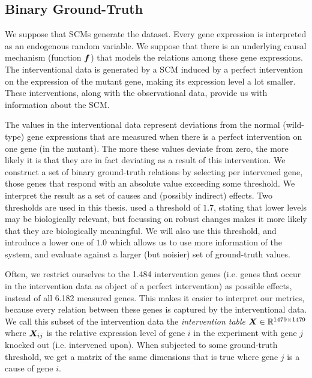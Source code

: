 \subsection{Binary Ground-Truth}
We suppose that SCMs generate the dataset. Every gene expression is interpreted as an endogenous random variable. We suppose that there is an underlying causal mechanism (function $\bm{f}$) that models the relations among these gene expressions. The interventional data is generated by a SCM induced by a perfect intervention on the expression of the mutant gene, making its expression level a lot smaller. These interventions, along with the observational data, provide us with information about the SCM. 

The values in the interventional data represent deviations from the normal (wild-type) gene expressions that are measured when there is a perfect intervention on one gene (in the mutant). The more these values deviate from zero, the more likely it is that they are in fact deviating as a result of this intervention. We construct a set of binary ground-truth relations by selecting per intervened gene, those genes that respond with an absolute value exceeding some threshold. We interpret the result as a set of causes and (possibly indirect) effects. Two thresholds are used in this thesis. \citet{kemmeren2014large} used a threshold of $1.7$, stating that lower levels may be biologically relevant, but focussing on robust changes makes it more likely that they are biologically meaningful. We will also use this threshold, and introduce a lower one of $1.0$ which allows us to use more information of the system, and evaluate against a larger (but noisier) set of ground-truth values. 

Often, we restrict ourselves to the 1.484 intervention genes (i.e. genes that occur in the intervention data as object of a perfect intervention) as possible effects, instead of all 6.182 measured genes. This makes it easier to interpret our metrics, because every relation between these genes is captured by the interventional data. We call this subset of the intervention data the \textit{intervention table} $\bm{X} \in \mathbb{R}^{1479\times 1479}$ where $\bm{X}_{ij}$ is the relative expression level of gene $i$ in the experiment with gene $j$ knocked out (i.e. intervened upon). When subjected to some ground-truth threshold, we get a matrix of the same dimensions that is true where gene $j$ is a cause of gene $i$.

